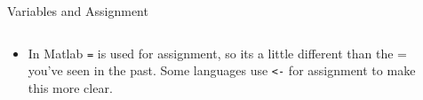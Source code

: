 {}\documentclass[letterpaper,
compress,
xcolor=x11names,
]{beamer}
\begin{document}
\begin{frame}{Variables and Assignment}
\begin{itemize}
\begin{columns}
\begin{column}{0.65\linewidth}
\begin{itemize}
					\item<4-> In Matlab \texttt{=} is used for assignment, so its a little different than the = you've seen in the past. Some languages use \texttt{<-} for assignment to make this more clear.
				\end{itemize}
			\end{column}
			\begin{column}{0.3\linewidth}
				\begin{center}
				\end{center}
			\end{column}
		\end{columns}
	\end{itemize}
\end{frame}
\end{document}
